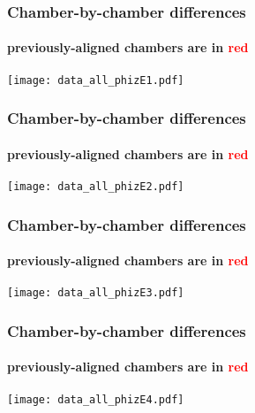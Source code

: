 \documentclass[compress]{beamer}
\begin{document}
\begin{frame}
\frametitle{Chamber-by-chamber differences}
\framesubtitle{previously-aligned chambers are in \textcolor{red}{red}}
\texttt{[image: data\_all\_phizE1.pdf]}
\end{frame}

\begin{frame}
\frametitle{Chamber-by-chamber differences}
\framesubtitle{previously-aligned chambers are in \textcolor{red}{red}}
\texttt{[image: data\_all\_phizE2.pdf]}
\end{frame}

\begin{frame}
\frametitle{Chamber-by-chamber differences}
\framesubtitle{previously-aligned chambers are in \textcolor{red}{red}}
\texttt{[image: data\_all\_phizE3.pdf]}
\end{frame}

\begin{frame}
\frametitle{Chamber-by-chamber differences}
\framesubtitle{previously-aligned chambers are in \textcolor{red}{red}}
\texttt{[image: data\_all\_phizE4.pdf]}
\end{frame}
\end{document}
